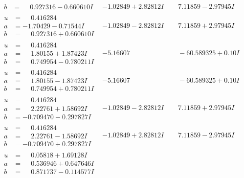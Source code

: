\documentclass[1p]{elsarticle_modified}
\theoremstyle{definition}
\begin{document}
$$\begin{array}{c|c|c}
\begin{aligned}
b &= \phantom{-}0.927316 - 0.660610 I\end{aligned}
 & -1.02849 + 2.82812 I & \phantom{-}7.11859 - 2.97945 I \\ \hline\begin{aligned}
u &= \phantom{-}0.416284\phantom{ +0.000000I} \\
a &= -1.70429 - 0.71544 I \\
b &= \phantom{-}0.927316 + 0.660610 I\end{aligned}
 & -1.02849 - 2.82812 I & \phantom{-}7.11859 + 2.97945 I \\ \hline\begin{aligned}
u &= \phantom{-}0.416284\phantom{ +0.000000I} \\
a &= \phantom{-}1.80155 + 1.87423 I \\
b &= \phantom{-}0.749954 - 0.780211 I\end{aligned}
 & -5.16607\phantom{ +0.000000I} & \phantom{-}                -6
0.589325 + 0. 10   I\phantom{ +0.000000I} \\ \hline\begin{aligned}
u &= \phantom{-}0.416284\phantom{ +0.000000I} \\
a &= \phantom{-}1.80155 - 1.87423 I \\
b &= \phantom{-}0.749954 + 0.780211 I\end{aligned}
 & -5.16607\phantom{ +0.000000I} & \phantom{-}                -6
0.589325 + 0. 10   I\phantom{ +0.000000I} \\ \hline\begin{aligned}
u &= \phantom{-}0.416284\phantom{ +0.000000I} \\
a &= \phantom{-}2.22761 + 1.58692 I \\
b &= -0.709470 - 0.297827 I\end{aligned}
 & -1.02849 - 2.82812 I & \phantom{-}7.11859 + 2.97945 I \\ \hline\begin{aligned}
u &= \phantom{-}0.416284\phantom{ +0.000000I} \\
a &= \phantom{-}2.22761 - 1.58692 I \\
b &= -0.709470 + 0.297827 I\end{aligned}
 & -1.02849 + 2.82812 I & \phantom{-}7.11859 - 2.97945 I \\ \hline\begin{aligned}
u &= \phantom{-}0.05818 + 1.69128 I \\
a &= \phantom{-}0.536946 + 0.647646 I \\
b &= \phantom{-}0.871737 - 0.114577 I\end{aligned}

\end{array}$$
\end{document}
